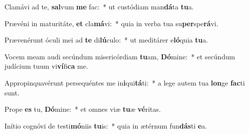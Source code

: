 \item Clamávi ad te, \textbf{sal}vum \textbf{me} fac:~* ut custódiam man\textbf{dá}ta \textbf{tu}a.
\item Prævéni in maturitáte, \textbf{et} cla\textbf{má}vi:~* quia in verba tua su\textbf{per}spe\textbf{rá}vi.
\item Prævenérunt óculi mei ad \textbf{te} di\textbf{lú}culo:~* ut meditárer e\textbf{ló}quia \textbf{tu}a.
\item Vocem meam audi secúndum misericórdiam \textbf{tu}am, \textbf{Dó}mine:~* et secúndum judícium tuum vi\textbf{ví}fi\textbf{ca} me.
\item Appropinquavérunt persequéntes me in\textbf{i}qui\textbf{tá}ti:~* a lege autem tua \textbf{lon}ge \textbf{fac}ti sunt.
\item Prope \textbf{es} tu, \textbf{Dó}mine:~* et omnes viæ \textbf{tu}æ \textbf{vé}ritas.
\item Inítio cognóvi de testi\textbf{mó}niis \textbf{tu}is:~* quia in ætérnum fun\textbf{dás}ti \textbf{e}a.
